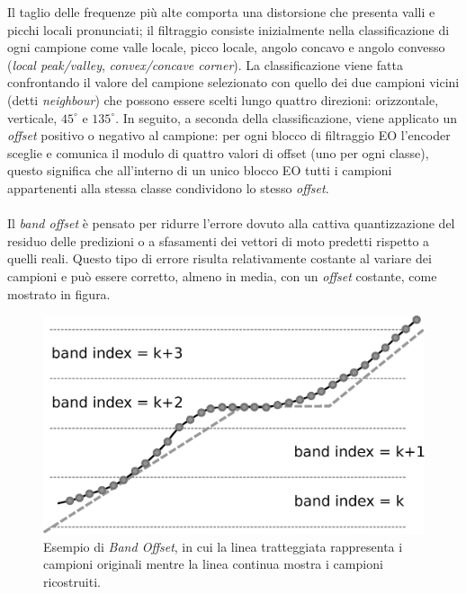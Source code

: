 Il taglio delle frequenze più alte comporta una distorsione che presenta valli e
picchi locali pronunciati; il filtraggio consiste inizialmente nella 
classificazione di ogni campione come valle locale, picco locale, angolo concavo
e angolo convesso (\emph{local peak/valley}, \emph{convex/concave corner}).
La classificazione viene fatta confrontando il valore del campione selezionato 
con quello dei due campioni vicini (detti \emph{neighbour}) che possono essere 
scelti lungo quattro direzioni: orizzontale, verticale, $45^{\circ}$ e 
$135^{\circ}$. In seguito, a seconda della classificazione, viene applicato un
\emph{offset} positivo o negativo al campione: per ogni blocco di filtraggio EO
l'encoder sceglie e comunica il modulo di quattro valori di offset (uno per ogni
classe), questo significa che all'interno di un unico blocco EO tutti i campioni
appartenenti alla stessa classe condividono lo stesso \emph{offset}.
\\ \\
Il \emph{band offset} è pensato per ridurre l'errore dovuto alla cattiva 
quantizzazione del residuo delle predizioni o a sfasamenti dei vettori di moto 
predetti rispetto a quelli reali. Questo tipo di errore risulta relativamente 
costante al variare dei campioni e può essere corretto, almeno in media, con un 
\emph{offset} costante, come mostrato in figura.

\begin{figure}[H]
  \centering
  \captionsetup{justification=raggedright}
	  \includegraphics[scale=0.5]{Figures/Band_offset}
  \caption[Esempio di \emph{Band Offset}]
  	  {Esempio di \emph{Band Offset}, in cui la linea tratteggiata
	   rappresenta i campioni originali mentre la linea continua mostra
	   i campioni ricostruiti.}
\end{figure}

